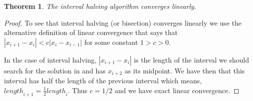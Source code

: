 \documentclass[12pt]{article}
\newtheorem{thm}{Theorem}
\begin{document}
\begin{thm}
The interval halving algorithm converges linearly.
\end{thm}

\begin{proof}
To see that interval halving (or bisection) converges linearly we use the alternative definition of linear convergence that says that $ |x_{i+1}-x_i|<c |x_i-x_{i-1}|$ for some constant $1>c>0$.

In the case of interval halving, $|x_{i+1}-x_i|$ is the length of the interval we should search for the solution in and has $x_{i+2}$ as its midpoint. We have then that this interval has half the length of the previous interval which means, $\mathit{length}_{i+1} = \frac{1}{2}\mathit{length}_i $. Thus $c= 1/2$ and we have exact  linear  convergence.
\end{proof}
\end{document}
